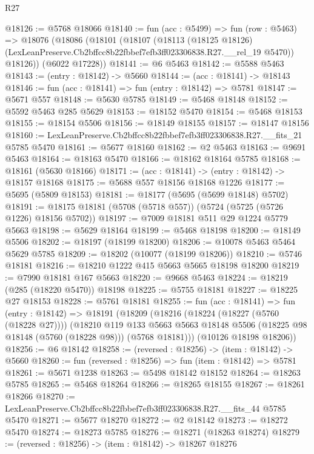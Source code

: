 \begin{lexlean}{R27}
\begin{coremodule}
@18126 := @5768 @18066
@18140 := fun (acc : @5499) =>
  fun (row : @5463) =>
  @18076
    (@18086
      (@18101
        (@18107
          (@18113
            (@18125 @18126)
            (LexLeanPreserve.Cb2bffcc8b22fbbef7efb3ff023306838.R27.__rel_19 @5470))
          @18126))
      (@6022 @17228))
@18141 := @6 @5463
@18142 := @5588 @5463
@18143 := (entry : @18142) -> @5660
@18144 := (acc : @18141) -> @18143
@18146 := fun (acc : @18141) => fun (entry : @18142) => @5781
@18147 := @5671 @557
@18148 := @5630 @5785
@18149 := @5468 @18148
@18152 := @5592 @5463 @285 @5629
@18153 := @18152 @5470
@18154 := @5468 @18153
@18155 := @18154 @5506
@18156 := @18149 @18155
@18157 := @18147 @18156
@18160 := LexLeanPreserve.Cb2bffcc8b22fbbef7efb3ff023306838.R27.__fits_21 @5785 @5470
@18161 := @5677 @18160
@18162 := @2 @5463
@18163 := @9691 @5463
@18164 := @18163 @5470
@18166 := @18162 @18164 @5785
@18168 := @18161 (@5630 @18166)
@18171 := (acc : @18141) -> (entry : @18142) -> @18157 @18168
@18175 := @5688 @557 @18156 @18168 @1226
@18177 := @5695 (@5809 @18153)
@18181 := @18177 (@5695 (@5699 @18148) @5702)
@18191 := @18175 @18181 (@5708 (@5718 @557)) (@5724 (@5725 (@5726 @1226) @18156 @5702))
@18197 := @7009 @18181 @511 @29 @1224 @5779 @5663
@18198 := @5629 @18164
@18199 := @5468 @18198
@18200 := @18149 @5506
@18202 := @18197 (@18199 @18200)
@18206 := @10078 @5463 @5464 @5629 @5785
@18209 := @18202 (@10077 (@18199 @18206))
@18210 := @5746 @18181
@18216 := @18210 @1222 @415 @5663 @5665 @18198 @18200
@18219 := @7990 @18181 @167 @5663
@18220 := @9668 @5463
@18224 := @18219 (@285 (@18220 @5470)) @18198
@18225 := @5755 @18181
@18227 := @18225 @27 @18153
@18228 := @5761 @18181
@18255 := fun (acc : @18141) =>
  fun (entry : @18142) =>
  @18191
    (@18209
      (@18216
        (@18224 (@18227 (@5760 (@18228 @27))))
        (@18210
          @119
          @133
          @5663
          @5663
          @18148
          @5506
          (@18225 @98 @18148 (@5760 (@18228 @98)))
          (@5768 @18181)))
      (@10126 @18198 @18206))
@18256 := @6 @18142
@18258 := (reversed : @18256) -> (item : @18142) -> @5660
@18260 := fun (reversed : @18256) => fun (item : @18142) => @5781
@18261 := @5671 @1238
@18263 := @5498 @18142 @18152
@18264 := @18263 @5785
@18265 := @5468 @18264
@18266 := @18265 @18155
@18267 := @18261 @18266
@18270 := LexLeanPreserve.Cb2bffcc8b22fbbef7efb3ff023306838.R27.__fits_44 @5785 @5470
@18271 := @5677 @18270
@18272 := @2 @18142
@18273 := @18272 @5470
@18274 := @18273 @5785
@18276 := @18271 (@18263 @18274)
@18279 := (reversed : @18256) -> (item : @18142) -> @18267 @18276

\end{coremodule}
\end{lexlean}
